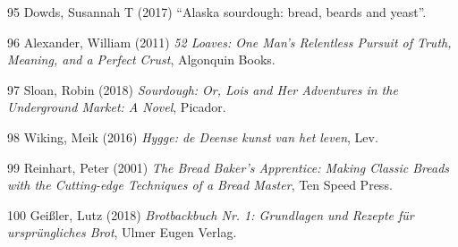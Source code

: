 \documentclass[
  11pt,
  dutch,
]{memoir}
\newlength{\cslhangindent}
\newenvironment{cslreferences}%
  {\setlength{\parindent}{0pt}%
  \everypar{\setlength{\hangindent}{\cslhangindent}}\ignorespaces}%
  {\par}
\begin{document}
\begin{cslreferences}
\leavevmode\hypertarget{ref-dowds2017alaska}{}%
95 Dowds, Susannah T (2017) ``Alaska sourdough: bread, beards and
yeast''.

\leavevmode\hypertarget{ref-52loaves}{}%
96 Alexander, William (2011) \emph{52 Loaves: One Man's Relentless
Pursuit of Truth, Meaning, and a Perfect Crust}, Algonquin Books.

\leavevmode\hypertarget{ref-sdfictie}{}%
97 Sloan, Robin (2018) \emph{Sourdough: Or, Lois and Her Adventures in
the Underground Market: A Novel}, Picador.

\leavevmode\hypertarget{ref-hygge}{}%
98 Wiking, Meik (2016) \emph{Hygge: de Deense kunst van het leven}, Lev.

\leavevmode\hypertarget{ref-breadapprentice}{}%
99 Reinhart, Peter (2001) \emph{The Bread Baker's Apprentice: Making
Classic Breads with the Cutting-edge Techniques of a Bread Master}, Ten
Speed Press.

\leavevmode\hypertarget{ref-lutz1}{}%
100 Geißler, Lutz (2018) \emph{Brotbackbuch Nr. 1: Grundlagen und
Rezepte für ursprüngliches Brot}, Ulmer Eugen Verlag.
\end{cslreferences}

\backmatter

\cleardoublepage
\listoffigures 
\listoftables
\end{document}
